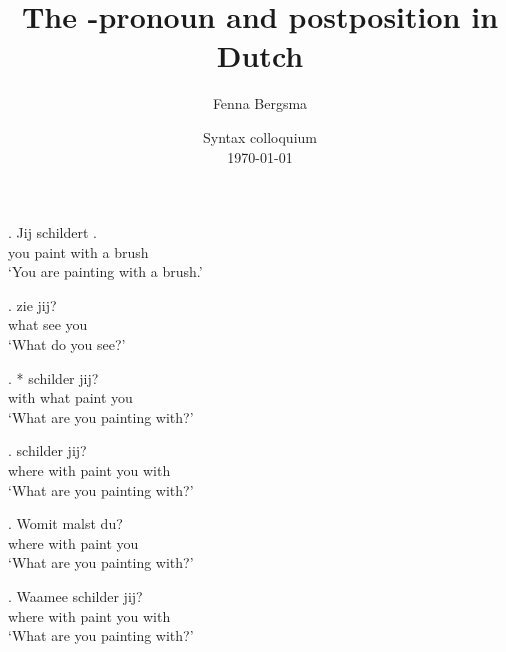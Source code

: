 \documentclass[xcolor=dvipsnames,10pt]{beamer}
\title{The \tsc{r}-pronoun and postposition \tit{waar-mee} in Dutch}
\author{Fenna Bergsma}
\date{Syntax colloquium\\ \today}
\institute{Goethe-Universität Frankfurt}
\begin{document}
\begin{frame}
\titlepage

\end{frame}


\begin{frame}

\exg. Jij schildert   .\\
 you paint with a brush\\
 `You are painting with a brush.'\label{ex:metwat}

\pause

\exg.  zie jij?\\
 what see you\\
 `What do you see?'\label{ex:wat}

\pause

\exg. *  schilder jij?\\
 with what paint you\\
 `What are you painting with?'\label{ex:metwat}

\pause

\exg.  schilder jij?\\
 {where with} paint you with\\
 `What are you painting with?'\label{ex:waar-mee}

\end{frame}


\begin{frame}

\exg. Womit malst du?\\
 {where with} paint you\\
 `What are you painting with?'

\pause

\exg. Waamee schilder jij?\\
 {where with} paint you with\\
 `What are you painting with?'\label{ex:waar-mee}

\end{frame}
\end{document}
